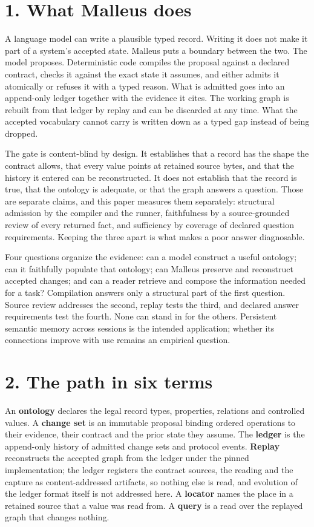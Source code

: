 \section*{1. What Malleus does}

A language model can write a plausible typed record. Writing it does not make it part of a system's accepted state. Malleus puts a boundary between the two. The model proposes. Deterministic code compiles the proposal against a declared contract, checks it against the exact state it assumes, and either admits it atomically or refuses it with a typed reason. What is admitted goes into an append-only ledger together with the evidence it cites. The working graph is rebuilt from that ledger by replay and can be discarded at any time. What the accepted vocabulary cannot carry is written down as a typed gap instead of being dropped.

The gate is content-blind by design. It establishes that a record has the shape the contract allows, that every value points at retained source bytes, and that the history it entered can be reconstructed. It does not establish that the record is true, that the ontology is adequate, or that the graph answers a question. Those are separate claims, and this paper measures them separately: structural admission by the compiler and the runner, faithfulness by a source-grounded review of every returned fact, and sufficiency by coverage of declared question requirements. Keeping the three apart is what makes a poor answer diagnosable.

Four questions organize the evidence: can a model construct a useful ontology; can it faithfully populate that ontology; can Malleus preserve and reconstruct accepted changes; and can a reader retrieve and compose the information needed for a task? Compilation answers only a structural part of the first question. Source review addresses the second, replay tests the third, and declared answer requirements test the fourth. None can stand in for the others. Persistent semantic memory across sessions is the intended application; whether its connections improve with use remains an empirical question.

\section*{2. The path in six terms}

An \textbf{ontology} declares the legal record types, properties, relations and controlled values. A \textbf{change set} is an immutable proposal binding ordered operations to their evidence, their contract and the prior state they assume. The \textbf{ledger} is the append-only history of admitted change sets and protocol events. \textbf{Replay} reconstructs the accepted graph from the ledger under the pinned implementation; the ledger registers the contract sources, the reading and the capture as content-addressed artifacts, so nothing else is read, and evolution of the ledger format itself is not addressed here. A \textbf{locator} names the place in a retained source that a value was read from. A \textbf{query} is a read over the replayed graph that changes nothing.

